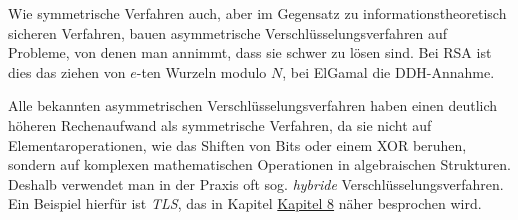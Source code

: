 Wie symmetrische Verfahren auch, aber im Gegensatz zu
informationstheoretisch sicheren Verfahren, bauen asymmetrische
Verschlüsselungsverfahren auf Probleme, von denen man annimmt, dass sie
schwer zu lösen sind. Bei RSA ist dies das ziehen von $e$-ten Wurzeln
modulo $N$, bei ElGamal die DDH-Annahme.

Alle bekannten asymmetrischen Verschlüsselungsverfahren haben einen
deutlich höheren Rechenaufwand als symmetrische Verfahren, da sie nicht
auf Elementaroperationen, wie das Shiften von
Bits oder einem XOR beruhen, sondern auf komplexen mathematischen
Operationen in algebraischen Strukturen. Deshalb
verwendet man in der Praxis oft sog. \emph{hybride}
Verschlüsselungsverfahren. Ein Beispiel hierfür ist \emph{TLS}, das in
Kapitel \hyperref[cha:keyexchange]{Kapitel 8} näher besprochen wird.





